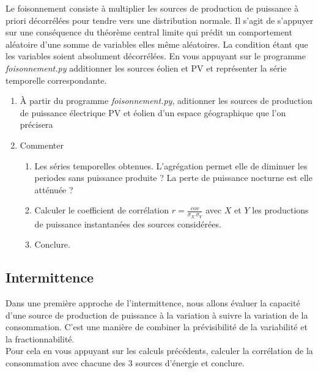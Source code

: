 \documentclass[12pt,a4,french]{article}
\newcommand{\tmtextit}[1]{{\itshape{#1}}}
\begin{document}
Le foisonnement consiste à multiplier les sources de production de puissance
à priori décorrélées pour tendre vers une distribution normale. Il s'agit de s'appuyer sur une conséquence du théorème central limite qui prédit un
comportement aléatoire d'une somme de variables elles même aléatoires. La
condition étant que les variables soient absolument décorrélées. En vous
appuyant sur le programme \tmtextit{foisonnement.py} additionner les sources
éolien et PV et représenter la série temporelle correspondante.

\begin{enumerate}
  \item À partir du programme \tmtextit{foisonnement.py}, aditionner les
  sources de production de puissance électrique PV et éolien d'un espace géographique que l'on précisera 
  
  \item Commenter
  \begin{enumerate}
    \item Les séries temporelles obtenues. L'agrégation permet elle de
    diminuer les periodes sans puissance produite ? La perte de puissance
    nocturne est elle atténuée ?
     
    \item Calculer le coefficient de corrélation $r=\frac{cov}{\sigma_X \, \sigma_Y}$ avec $X$ et $Y$ les productions de puissance instantanées des sources considérées. 
    
    \item Conclure.
  \end{enumerate}
\end{enumerate}

\subsection{Intermittence}

Dans une première approche de l'intermittence, nous allons évaluer la
capacité d'une source de production de puissance à la variation à suivre la variation de la consommation. C'est une manière de combiner la prévisibilité de la variabilité et la fractionnabilité. \\
Pour cela en vous appuyant sur les calculs précédents, calculer la corrélation de la consommation avec chacune des 3 sources d'énergie et conclure.

%
%
%	
%	
\end{document}
